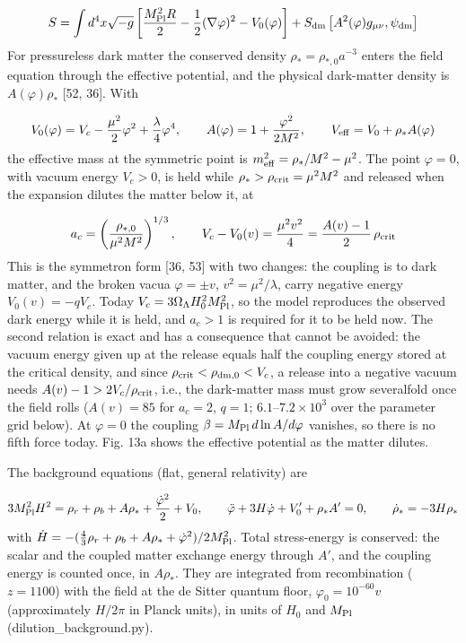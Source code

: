 \documentclass[11pt,a4paper]{article}
\begin{document}
\begin{equation}
S=\int d^4x\sqrt{-g}\left[\frac{M_{\rm Pl}^2R}{2}-\frac{1}{2}(\nabla\varphi)^2-V_0(\varphi)\right]+S_{\rm dm}\left[A^2(\varphi)g_{\mu\nu},\psi_{\rm dm}\right]
\end{equation}
For pressureless dark matter the conserved density $\rho_*=\rho_{*,0}a^{-3}$ enters the field equation through the effective potential, and the physical dark-matter density is $A(\varphi)\rho_*$ [52, 36]. With

\begin{equation}
V_0(\varphi)=V_c-\frac{\mu^2}{2}\varphi^2+\frac{\lambda}{4}\varphi^4,\qquad A(\varphi)=1+\frac{\varphi^2}{2M^2},\qquad V_{\rm eff}=V_0+\rho_*A(\varphi)
\end{equation}
the effective mass at the symmetric point is $m_{\rm eff}^2=\rho_*/M^2-\mu^2$. The point $\varphi=0$, with vacuum energy $V_c>0$, is held while $\rho_*>\rho_{\rm crit}=\mu^2M^2$ and released when the expansion dilutes the matter below it, at

\begin{equation}
a_c=\left(\frac{\rho_{*,0}}{\mu^2M^2}\right)^{1/3},\qquad V_c-V_0(v)=\frac{\mu^2v^2}{4}=\frac{A(v)-1}{2}\,\rho_{\rm crit}
\end{equation}
This is the symmetron form [36, 53] with two changes: the coupling is to dark matter, and the broken vacua $\varphi=\pm v$, $v^2=\mu^2/\lambda$, carry negative energy $V_0(v)=-qV_c$. Today $V_c=3\Omega_\Lambda H_0^2M_{\rm Pl}^2$, so the model reproduces the observed dark energy while it is held, and $a_c>1$ is required for it to be held now. The second relation is exact and has a consequence that cannot be avoided: the vacuum energy given up at the release equals half the coupling energy stored at the critical density, and since $\rho_{\rm crit}<\rho_{\rm dm,0}<V_c$, a release into a negative vacuum needs $A(v)-1>2V_c/\rho_{\rm crit}$, i.e., the dark-matter mass must grow severalfold once the field rolls ($A(v)=85$ for $a_c=2$, $q=1$; $6.1$--$7.2\times10^{3}$ over the parameter grid below). At $\varphi=0$ the coupling $\beta=M_{\rm Pl}\,d\ln A/d\varphi$ vanishes, so there is no fifth force today. Fig. 13a shows the effective potential as the matter dilutes.

The background equations (flat, general relativity) are

\begin{equation}
3M_{\rm Pl}^2H^2=\rho_r+\rho_b+A\rho_*+\frac{\dot\varphi^2}{2}+V_0,\qquad \ddot\varphi+3H\dot\varphi+V_0'+\rho_*A'=0,\qquad \dot\rho_*=-3H\rho_*
\end{equation}
with $\dot H=-(\tfrac43\rho_r+\rho_b+A\rho_*+\dot\varphi^2)/2M_{\rm Pl}^2$. Total stress-energy is conserved: the scalar and the coupled matter exchange energy through $A'$, and the coupling energy is counted once, in $A\rho_*$. They are integrated from recombination ($z=1100$) with the field at the de Sitter quantum floor, $\varphi_0=10^{-60}v$ (approximately $H/2\pi$ in Planck units), in units of $H_0$ and $M_{\rm Pl}$ (dilution\_background.py).
\end{document}
